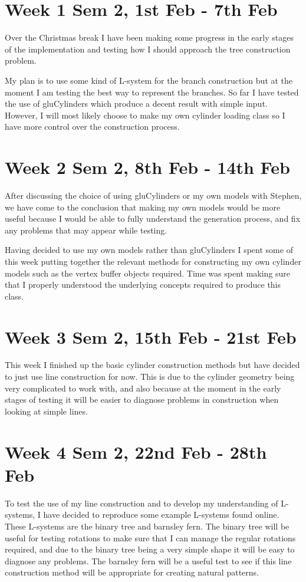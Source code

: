 \documentclass[11pt]{article}
\begin{document}
\section*{Week 1 Sem 2, 1st Feb - 7th Feb}
Over the Christmas break I have been making some progress in the early stages of the implementation 
and testing how I should approach the tree construction problem. 

My plan is to use some kind of L-system for the branch construction but at the moment I am 
testing the best way to represent the branches. So far I have tested the use of gluCylinders 
which produce a decent result with simple input. However, I will most likely choose to make my 
own cylinder loading class so I have more control over the construction process. 

\section*{Week 2 Sem 2, 8th Feb - 14th Feb}
After discussing the choice of using gluCylinders or my own models with Stephen, we have come 
to the conclusion that making my own models would be more useful because I would be able to 
fully understand the generation process, and fix any problems that may appear while testing.

Having decided to use my own models rather than gluCylinders I spent some of this week putting 
together the relevant methods for constructing my own cylinder models such as the vertex 
buffer objects required. Time was spent making sure that I properly understood the underlying 
concepts required to produce this class. 

\section*{Week 3 Sem 2, 15th Feb - 21st Feb}
This week I finished up the basic cylinder construction methods but have decided to just use 
line construction for now. This is due to the cylinder geometry being very complicated to work 
with, and also because at the moment in the early stages of testing it will be easier to diagnose 
problems in construction when looking at simple lines. 

\section*{Week 4 Sem 2, 22nd Feb - 28th Feb}
To test the use of my line construction and to develop my understanding of L-systems, I have 
decided to reproduce some example L-systems found online. These L-systems are the binary tree 
and barnsley fern. The binary tree will be useful for testing rotations to make sure that I 
can manage the regular rotations required, and due to the binary tree being a very simple shape 
it will be easy to diagnose any problems. The barnsley fern will be a useful test to see if 
this line construction method will be appropriate for creating natural patterns. 
\end{document}
